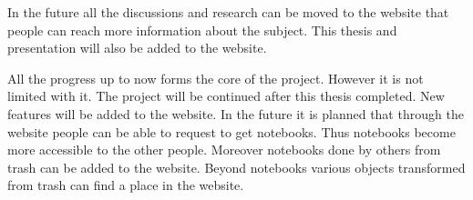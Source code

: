 In the future all the discussions and research can be moved to the website that people can reach more information about the subject. This thesis and presentation will also be added to the website. 

All the progress up to now forms the core of the project. However it is not limited with it. The project will be continued after this thesis completed. New features will be added to the website. In the future it is planned that through the website people can be able to request to get notebooks. Thus notebooks become more accessible to the other people. Moreover notebooks done by others from trash can be added to the website. Beyond notebooks various objects transformed from trash can find a place in the website.
